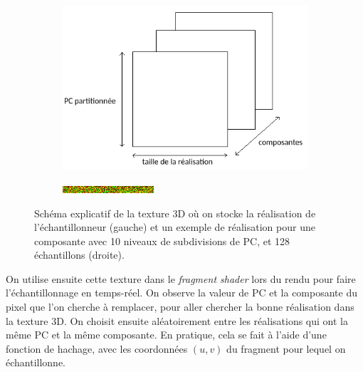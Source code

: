 \begin{figure}
    \centering
    \begin{subfigure}{.5\textwidth}
        \centering
        \includegraphics[width=\textwidth]{contenu/resources/images/sampler_realization}
    \end{subfigure}
    \hfill
    \begin{subfigure}{.45\textwidth}
        \centering
        \includegraphics[width=\textwidth]{contenu/resources/images/realization_pc_0}
    \end{subfigure}

    \caption[Réalisation de l'échantillonneur préférentiel]{Schéma explicatif de la texture 3D où on stocke la réalisation de l'échantillonneur (gauche) et un exemple de réalisation pour une composante avec 10 niveaux de subdivisions de PC, et 128 échantillons (droite).}
    \label{fig:sampler-realization}
\end{figure}

On utilise ensuite cette texture dans le \textit{fragment shader} lors du rendu pour faire l'échantillonnage en temps-réel. On observe la valeur de PC et la composante du pixel que l'on cherche à remplacer, pour aller chercher la bonne réalisation dans la texture 3D. On choisit ensuite aléatoirement entre les réalisations qui ont la même PC et la même composante. En pratique, cela se fait à l'aide d'une fonction de hachage, avec les coordonnées $(u, v)$ du fragment pour lequel on échantillonne.

\bigskip


